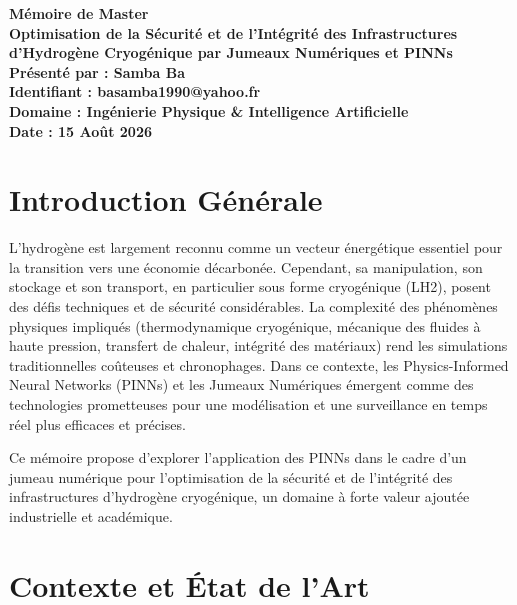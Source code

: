 \documentclass[12pt,a4paper,oneside]{report}
\begin{document}
\begin{titlepage}
    \centering
    \vspace*{2cm}
    {\Huge \textbf{Mémoire de Master}} \\
    \vspace{1.5cm}
    {\Large \textbf{Optimisation de la Sécurité et de l'Intégrité des Infrastructures d'Hydrogène Cryogénique par Jumeaux Numériques et PINNs}} \\
    \vspace{2cm}
    {\large \textbf{Présenté par : Samba Ba}} \\
    \vspace{1cm}
    {\large \textbf{Identifiant : basamba1990@yahoo.fr}} \\
    \vspace{2cm}
    {\large \textbf{Domaine : Ingénierie Physique \& Intelligence Artificielle}} \\
    \vfill
    {\large \textbf{Date : 15 Août 2026}}
\end{titlepage}

\tableofcontents

\chapter*{Introduction Générale}
L'hydrogène est largement reconnu comme un vecteur énergétique essentiel pour la transition vers une économie décarbonée. Cependant, sa manipulation, son stockage et son transport, en particulier sous forme cryogénique (LH2), posent des défis techniques et de sécurité considérables. La complexité des phénomènes physiques impliqués (thermodynamique cryogénique, mécanique des fluides à haute pression, transfert de chaleur, intégrité des matériaux) rend les simulations traditionnelles coûteuses et chronophages. Dans ce contexte, les Physics-Informed Neural Networks (PINNs) et les Jumeaux Numériques émergent comme des technologies prometteuses pour une modélisation et une surveillance en temps réel plus efficaces et précises.

Ce mémoire propose d'explorer l'application des PINNs dans le cadre d'un jumeau numérique pour l'optimisation de la sécurité et de l'intégrité des infrastructures d'hydrogène cryogénique, un domaine à forte valeur ajoutée industrielle et académique.

\chapter{Contexte et État de l'Art}
\end{document}
